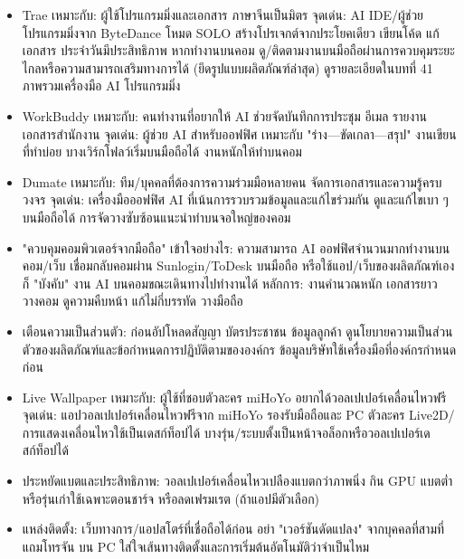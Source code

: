 
\begin{itemize}
  \item Trae เหมาะกับ: ผู้ใช้โปรแกรมมิ่งและเอกสาร ภาษาจีนเป็นมิตร จุดเด่น: AI IDE/ผู้ช่วยโปรแกรมมิ่งจาก ByteDance โหมด SOLO สร้างโปรเจกต์จากประโยคเดียว เขียนโค้ด แก้เอกสาร ประจำวันมีประสิทธิภาพ หากทำงานบนคอม ดู/ติดตามงานบนมือถือผ่านการควบคุมระยะไกลหรือความสามารถเสริมทางการได้ (ยึดรูปแบบผลิตภัณฑ์ล่าสุด) ดูรายละเอียดในบทที่ 41 ภาพรวมเครื่องมือ AI โปรแกรมมิ่ง
  \item WorkBuddy เหมาะกับ: คนทำงานที่อยากให้ AI ช่วยจัดบันทึกการประชุม อีเมล รายงาน เอกสารสำนักงาน จุดเด่น: ผู้ช่วย AI สำหรับออฟฟิศ เหมาะกับ "ร่าง—ขัดเกลา—สรุป" งานเขียนที่ทำบ่อย บางเวิร์กโฟลว์เริ่มบนมือถือได้ งานหนักให้ทำบนคอม
  \item Dumate เหมาะกับ: ทีม/บุคคลที่ต้องการความร่วมมือหลายคน จัดการเอกสารและความรู้ครบวงจร จุดเด่น: เครื่องมือออฟฟิศ AI ที่เน้นการรวบรวมข้อมูลและแก้ไขร่วมกัน ดูและแก้ไขเบา ๆ บนมือถือได้ การจัดวางซับซ้อนแนะนำทำบนจอใหญ่ของคอม
  \item "ควบคุมคอมพิวเตอร์จากมือถือ" เข้าใจอย่างไร: ความสามารถ AI ออฟฟิศจำนวนมากทำงานบนคอม/เว็บ เชื่อมกลับคอมผ่าน Sunlogin/ToDesk บนมือถือ หรือใช้แอป/เว็บของผลิตภัณฑ์เอง ก็ "บังคับ" งาน AI บนคอมขณะเดินทางไปทำงานได้ หลักการ: งานคำนวณหนัก เอกสารยาว วางคอม ดูความคืบหน้า แก้ไม่กี่บรรทัด วางมือถือ
  \item เตือนความเป็นส่วนตัว: ก่อนอัปโหลดสัญญา บัตรประชาชน ข้อมูลลูกค้า ดูนโยบายความเป็นส่วนตัวของผลิตภัณฑ์และข้อกำหนดการปฏิบัติตามขององค์กร ข้อมูลบริษัทใช้เครื่องมือที่องค์กรกำหนดก่อน
\end{itemize}


\begin{itemize}
  \item Live Wallpaper เหมาะกับ: ผู้ใช้ที่ชอบตัวละคร miHoYo อยากได้วอลเปเปอร์เคลื่อนไหวฟรี จุดเด่น: แอปวอลเปเปอร์เคลื่อนไหวฟรีจาก miHoYo รองรับมือถือและ PC ตัวละคร Live2D/การแสดงเคลื่อนไหวใช้เป็นเดสก์ท็อปได้ บางรุ่น/ระบบตั้งเป็นหน้าจอล็อกหรือวอลเปเปอร์เดสก์ท็อปได้
  \item ประหยัดแบตและประสิทธิภาพ: วอลเปเปอร์เคลื่อนไหวเปลืองแบตกว่าภาพนิ่ง กิน GPU แบตต่ำหรือรุ่นเก่าใช้เฉพาะตอนชาร์จ หรือลดเฟรมเรต (ถ้าแอปมีตัวเลือก)
  \item แหล่งติดตั้ง: เว็บทางการ/แอปสโตร์ที่เชื่อถือได้ก่อน อย่า "เวอร์ชันดัดแปลง" จากบุคคลที่สามที่แถมโทรจัน บน PC ใส่ใจเส้นทางติดตั้งและการเริ่มต้นอัตโนมัติว่าจำเป็นไหม
\end{itemize}

